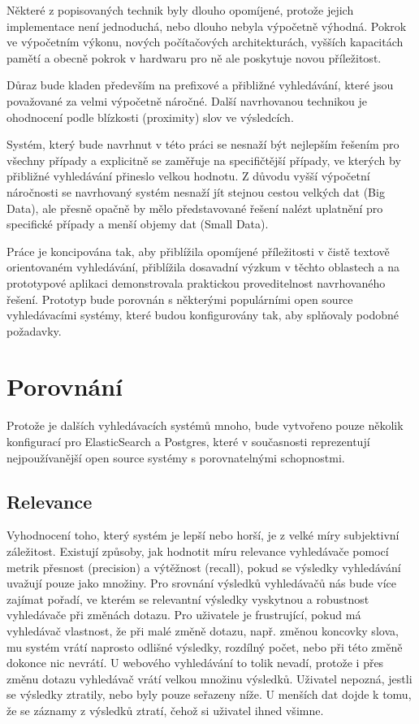 \documentclass[11pt,letterpaper,oneside,openright]{book}
\begin{document}
Některé z popisovaných technik byly dlouho opomíjené, protože jejich
implementace není jednoduchá, nebo dlouho nebyla výpočetně výhodná. Pokrok ve
výpočetním výkonu, nových počítačových architekturách, vyšších kapacitách
pamětí a obecně pokrok v hardwaru pro ně ale poskytuje novou příležitost.

Důraz bude kladen především na prefixové a přibližné vyhledávání, které jsou
považované za velmi výpočetně náročné. Další navrhovanou technikou je
ohodnocení podle blízkosti (proximity) slov ve výsledcích.

Systém, který bude navrhnut v této práci se nesnaží být nejlepším řešením pro
všechny případy a explicitně se zaměřuje na specifičtější případy, ve kterých
by přibližné vyhledávání přineslo velkou hodnotu. Z důvodu vyšší výpočetní
náročnosti se navrhovaný systém nesnaží jít stejnou cestou velkých dat (Big
Data), ale přesně opačně by mělo představované řešení nalézt uplatnění pro
specifické případy a menší objemy dat (Small Data).

Práce je koncipována tak, aby přiblížila opomíjené příležitosti v čistě textově
orientovaném vyhledávání, přiblížila dosavadní výzkum v těchto oblastech a na
prototypové aplikaci demonstrovala praktickou proveditelnost navrhovaného
řešení. Prototyp bude porovnán s některými populárními open source
vyhledávacími systémy, které budou konfigurovány tak, aby splňovaly podobné
požadavky.

\section{Porovnání}
Protože je dalších vyhledávacích systémů mnoho, bude vytvořeno pouze několik
konfigurací pro ElasticSearch a Postgres, které v současnosti reprezentují
nejpoužívanější open source systémy s porovnatelnými schopnostmi.

\subsection{Relevance}
Vyhodnocení toho, který systém je lepší nebo horší, je z velké míry subjektivní
záležitost. Existují způsoby, jak hodnotit míru relevance vyhledávače pomocí
metrik přesnost (precision) a výtěžnost (recall), pokud se výsledky vyhledávání
uvažují pouze jako množiny. Pro srovnání výsledků vyhledávačů nás bude více
zajímat pořadí, ve kterém se relevantní výsledky vyskytnou a robustnost
vyhledávače při změnách dotazu. Pro uživatele je frustrující, pokud má
vyhledávač vlastnost, že při malé změně dotazu, např.  změnou koncovky slova,
mu systém vrátí naprosto odlišné výsledky, rozdílný počet, nebo při této změně
dokonce nic nevrátí. U webového vyhledávání to tolik nevadí, protože i přes
změnu dotazu vyhledávač vrátí velkou množinu výsledků.  Uživatel nepozná,
jestli se výsledky ztratily, nebo byly pouze seřazeny níže. U menších dat dojde
k tomu, že se záznamy z výsledků ztratí, čehož si uživatel ihned všimne.
\end{document}
